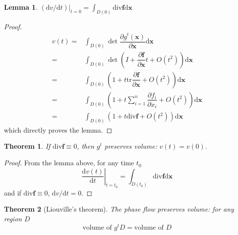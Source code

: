 \documentclass[conference]{IEEEtran}
\newtheorem{theorem}{Theorem}[section]
\newtheorem{lemma}{Lemma}[section]
\theoremstyle{definition}
\theoremstyle{remark}
\begin{document}
    \begin{lemma}
        $\left.(\mathrm{d} v/\mathrm{d} t)\right|_{t=0} = \int_{D(0)} \mathrm{div} \mathbf{f} \mathrm{d} \mathbf{x}$
    \end{lemma}

    \begin{proof}
        \begin{align*}
            v(t) =& \int_{D(0)} \det \dfrac{\partial g^t(\mathbf{x})}{\partial \mathbf{x}} \mathrm{d} \mathbf{x} \\
            =& \int_{D(0)} \det \left( I + \dfrac{\partial \mathbf{f}}{\partial \mathbf{x}} t + O(t^2) \right) \mathrm{d} \mathbf{x} \\
            =& \int_{D(0)} \left( 1 + t \mathrm{tr} \dfrac{\partial \mathbf{f}}{\partial \mathbf{x}} + O(t^2) \right) \mathrm{d} \mathbf{x} \\
            =& \int_{D(0)} \left( 1 + t \sum_{i = 1}^n \dfrac{\partial f_i}{\partial x_i} + O(t^2) \right) \mathrm{d} \mathbf{x} \\
            =& \int_{D(0)} \left( 1 + t \mathrm{div} \mathbf{f} + O(t^2) \right) \mathrm{d} \mathbf{x}
        \end{align*}
        which directly proves the lemma.
    \end{proof}

    \begin{theorem}
        If $\mathrm{div} \mathbf{f} \equiv 0$, then $g^t$ preserves volume: $v(t) = v(0)$.
    \end{theorem}

    \begin{proof}
        From the lemma above, for any time $t_0$
        \begin{equation*}
            \left. \dfrac{\mathrm{d} v(t)}{\mathrm{d} t} \right|_{t=t_0} = \int_{D(t_0)} \mathrm{div} \mathbf{f} \mathrm{d} \mathbf{x}
        \end{equation*}
        and if $\mathrm{div}\mathbf{f} \equiv 0$, $\mathrm{d} v / \mathrm{d} t = 0$.
    \end{proof}

    \begin{theorem}[Liouville's theorem]
        The phase flow preserves volume: for any region $D$
        \begin{equation*}
            \text{volume of } g^tD = \text{volume of } D
        \end{equation*}
    \end{theorem}
\end{document}
